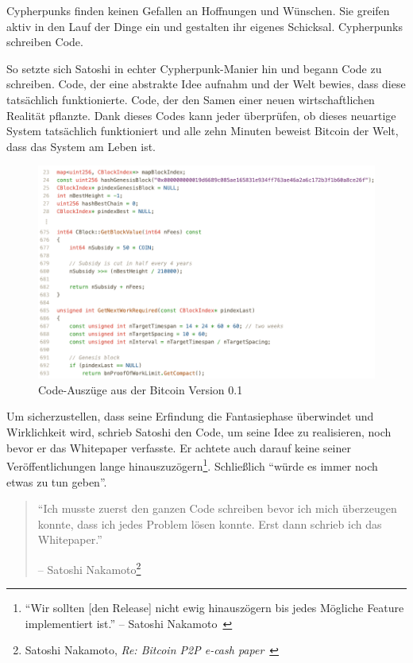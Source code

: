 Cypherpunks finden keinen Gefallen an Hoffnungen und Wünschen. Sie greifen aktiv
in den Lauf der Dinge ein und gestalten ihr eigenes Schicksal. Cypherpunks
schreiben Code.

So setzte sich Satoshi in echter Cypherpunk-Manier hin und begann Code zu
schreiben. Code, der eine abstrakte Idee aufnahm und der Welt bewies, dass diese
tatsächlich funktionierte. Code, der den Samen einer neuen wirtschaftlichen
Realität pflanzte. Dank dieses Codes kann jeder überprüfen, ob dieses neuartige
System tatsächlich funktioniert und alle zehn Minuten beweist Bitcoin der Welt,
dass das System am Leben ist.

\begin{figure}
  \includegraphics{assets/images/bitcoin-code-white.png}
  \caption{Code-Auszüge aus der Bitcoin Version 0.1}
  \label{fig:bitcoin-code-white}
\end{figure}

Um sicherzustellen, dass seine Erfindung die Fantasiephase überwindet und
Wirklichkeit wird, schrieb Satoshi den Code, um seine Idee zu realisieren, noch
bevor er das Whitepaper verfasste. Er achtete auch darauf keine seiner
Veröffentlichungen lange hinauszuzögern\footnote{\enquote{Wir sollten [den
Release] nicht ewig hinauszögern bis jedes Mögliche Feature implementiert ist.}
-- Satoshi Nakamoto~\cite{satoshi-delay}}. Schließlich \enquote{würde es immer
noch etwas zu tun geben}.

\begin{quotation}\begin{samepage}
\enquote{Ich musste zuerst den ganzen Code schreiben bevor ich mich überzeugen konnte, dass ich jedes Problem lösen konnte.
Erst dann schrieb ich das Whitepaper.}
\begin{flushright} -- Satoshi Nakamoto\footnote{Satoshi Nakamoto, \textit{Re: Bitcoin P2P e-cash paper}~\cite{satoshi-mail-code-first}}
\end{flushright}\end{samepage}\end{quotation}

